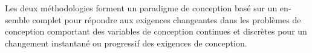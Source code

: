 \documentclass[12pt,Bold,letterpaper,TexShade,twoside]{mcgilletdclass}
\begin{document}
\begin{romanPagenumber}{2}
\begin{otherlanguage}{french}
{Les deux méthodologies forment un paradigme de conception basé sur un ensemble complet pour répondre aux exigences changeantes dans les problèmes de conception comportant des variables de conception continues et discrètes pour un changement instantané ou progressif des exigences de conception.}%
\AbstractFr%
\end{otherlanguage}
%
%
%
\tableofcontents %
\listoftables %
\listoffigures %

\end{romanPagenumber}



















\end{document}
